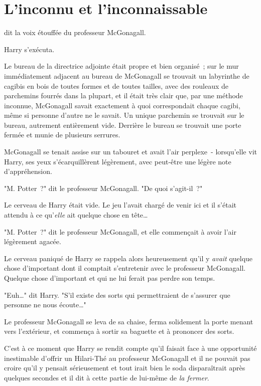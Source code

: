 \chapter{L'inconnu et l'inconnaissable}

 dit la voix étouffée du professeur McGonagall.

\hplettrineextrapara
Harry s'exécuta.

Le bureau de la directrice adjointe était propre et bien organisé~; sur le mur immédiatement adjacent au bureau de McGonagall se trouvait un labyrinthe de cagibis en bois de toutes formes et de toutes tailles, avec des rouleaux de parchemins fourrés dans la plupart, et il était très clair que, par une méthode inconnue, McGonagall savait exactement à quoi correspondait chaque cagibi, même si personne d'autre ne le savait. Un unique parchemin se trouvait sur le bureau, autrement entièrement vide. Derrière le bureau se trouvait une porte fermée et munie de plusieurs serrures.

McGonagall se tenait assise sur un tabouret et avait l'air perplexe~- lorsqu'elle vit Harry, ses yeux s'écarquillèrent légèrement, avec peut-être une légère note d'appréhension.

"M. Potter~?" dit le professeur McGonagall. "De quoi s'agit-il~?"

Le cerveau de Harry était vide. Le jeu l'avait chargé de venir ici et il s'était attendu à ce qu'\emph{elle} ait quelque chose en tête…

"M. Potter~?" dit le professeur McGonagall, et elle commençait à avoir l'air légèrement agacée.

Le cerveau paniqué de Harry se rappela alors heureusement qu'il y \emph{avait} quelque chose d'important dont il comptait s'entretenir avec le professeur McGonagall. Quelque chose d'important et qui ne lui ferait pas perdre son temps.

"Euh…" dit Harry. "S'il existe des sorts qui permettraient de s'assurer que personne ne nous écoute…"

Le professeur McGonagall se leva de sa chaise, ferma solidement la porte menant vers l'extérieur, et commença à sortir sa baguette et à prononcer des sorts.

C'est à ce moment que Harry se rendit compte qu'il faisait face à une opportunité inestimable d'offrir un Hilari-Thé au professeur McGonagall et il ne pouvait pas croire qu'il y pensait sérieusement et tout irait bien le soda disparaîtrait après quelques secondes et il dit à cette partie de lui-même de \emph{la fermer}.


